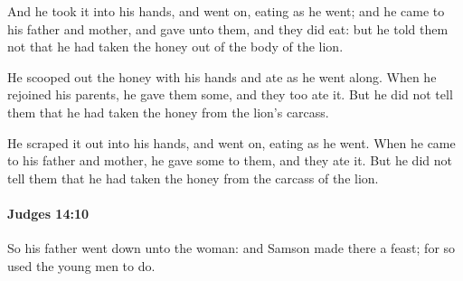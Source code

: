 			\begin{versebox}
					\item[BHS] 
					\item[ASV] And he took it into his hands, and went on, eating as he went; and he came to his father and mother, and gave unto them, and they did eat: but he told them not that he had taken the honey out of the body of the lion.
					\item[NIV] He scooped out the honey with his hands and ate as he went along. When he rejoined his parents, he gave them some, and they too ate it. But he did not tell them that he had taken the honey from the lion’s carcass.
					\item[NRSV] He scraped it out into his hands, and went on, eating as he went. When he came to his father and mother, he gave some to them, and they ate it. But he did not tell them that he had taken the honey from the carcass of the lion.
			\end{versebox}

		\paragraph{Judges 14:10} %
			\label{JUDGES-14-10}

			So his father went down unto the woman: and Samson made there a feast; for so used the young men to do.

